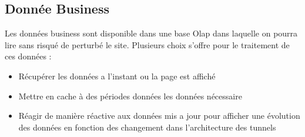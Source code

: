 \subsection{Donnée Business}
Les données business sont disponible dans une base Olap dans laquelle on pourra lire sans risqué de perturbé le site. Plusieurs choix s'offre pour le traitement de ces données :

\begin{itemize}
\item Récupérer les données a l’instant ou la page est affiché 
\item Mettre en cache à des périodes données les données nécessaire
\item Réagir de manière réactive aux données mis a jour pour afficher une évolution des données en fonction des changement dans l’architecture des tunnels
\end{itemize}

